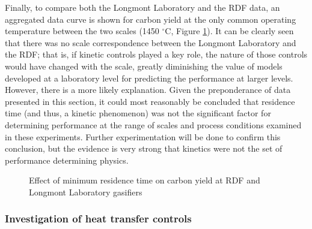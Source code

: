 \documentclass[11pt,twocolumn]{article}
\begin{document}


Finally, to compare both the Longmont Laboratory and the RDF data, an aggregated data curve is shown for carbon yield at the only common operating temperature between the two scales (1450 $^{\circ}$C, Figure \ref{fig-Agg-Xg-tmin-1450}).  It can be clearly seen that there was no scale correspondence between the Longmont Laboratory and the RDF; that is, if kinetic controls played a key role, the nature of those controls would have changed with the scale, greatly diminishing the value of models developed at a laboratory level for predicting the performance at larger levels.  However, there is a more likely explanation.  Given the preponderance of data presented in this section, it could most reasonably be concluded that residence time (and thus, a kinetic phenomenon) was not the significant factor for determining performance at the range of scales and process conditions examined in these experiments.  Further experimentation will be done to confirm this conclusion, but the evidence is very strong that kinetics were not the set of performance determining physics.

\begin{figure}[hp]

\caption{Effect of minimum residence time on carbon yield at RDF and Longmont Laboratory gasifiers}
\label{fig-Agg-Xg-tmin-1450}
\end{figure}



\subsubsection*{Investigation of heat transfer controls}
\end{document}
